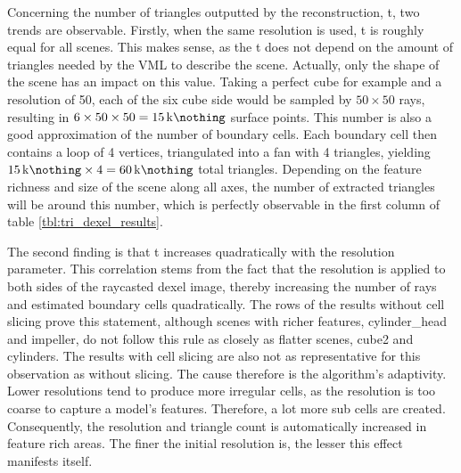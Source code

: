 %
Concerning the number of triangles outputted by the reconstruction, t, two trends are observable.
Firstly, when the same resolution is used, t is roughly equal for all scenes.
This makes sense, as the t does not depend on the amount of triangles needed by the VML to describe the scene.
Actually, only the shape of the scene has an impact on this value.
Taking a perfect cube for example and a resolution of 50, each of the six cube side would be sampled by $50\times50$ rays, resulting in $6 \times 50 \times 50 = \SI{15}{\kilo\nothing}$ surface points.
This number is also a good approximation of the number of boundary cells.
Each boundary cell then contains a loop of 4 vertices, triangulated into a fan with 4 triangles, yielding $\SI{15}{\kilo\nothing} \times 4 = \SI{60}{\kilo\nothing}$ total triangles.
Depending on the feature richness and size of the scene along all axes, the number of extracted triangles will be around this number, which is perfectly observable in the first column of table \ref{tbl:tri_dexel_results}.

The second finding is that t increases quadratically with the resolution parameter.
This correlation stems from the fact that the resolution is applied to both sides of the raycasted dexel image, thereby increasing the number of rays and estimated boundary cells quadratically.
The rows of the results without cell slicing prove this statement, although scenes with richer features, \eg cylinder\_head and impeller, do not follow this rule as closely as flatter scenes, \eg cube2 and cylinders.
The results with cell slicing are also not as representative for this observation as without slicing.
The cause therefore is the algorithm's adaptivity.
Lower resolutions tend to produce more irregular cells, as the resolution is too coarse to capture a model's features.
Therefore, a lot more sub cells are created.
Consequently, the resolution and triangle count is automatically increased in feature rich areas.
The finer the initial resolution is, the lesser this effect manifests itself.

